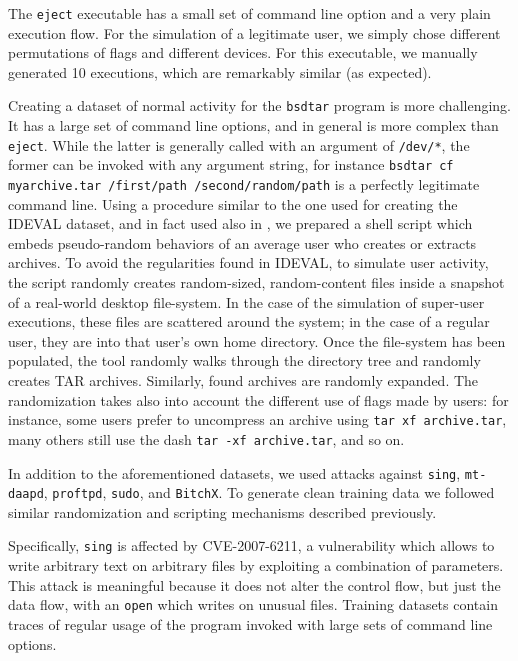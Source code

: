 The \texttt{eject} executable has a small set of command line option
and a very plain execution flow. For the simulation of a legitimate
user, we simply chose different permutations of flags and different
devices. For this executable, we manually generated 10 executions,
which are remarkably similar (as expected).

Creating a dataset of normal activity for the \texttt{bsdtar} program
is more challenging. It has a large set of command line options, and
in general is more complex than \texttt{eject}. While the latter is
generally called with an argument of \texttt{/dev/*}, the former can
be invoked with any argument string, for instance \texttt{bsdtar cf
  myarchive.tar /first/path /second/random/path} is a perfectly
legitimate command line. Using a procedure similar to the one used for
creating the \ac{IDEVAL} dataset, and in fact used also
in \citep{sekar:sp2001:automaton}, we prepared a shell script which
embeds pseudo-random behaviors of an average user who creates or
extracts archives. To avoid the regularities found in
\ac{IDEVAL}, to simulate user activity, the script
randomly creates random-sized, random-content files inside a snapshot
of a real-world desktop file-system. In the case of the simulation of
super-user executions, these files are scattered around the system; in
the case of a regular user, they are into that user's own home
directory. Once the file-system has been populated, the tool randomly
walks through the directory tree and randomly creates TAR
archives. Similarly, found archives are randomly expanded. The
randomization takes also into account the different use of flags made
by users: for instance, some users prefer to uncompress an archive
using \texttt{tar xf archive.tar}, many others still use the dash
\texttt{tar -xf archive.tar}, and so on.

In addition to the aforementioned datasets, we used attacks against
\texttt{sing}, \texttt{mt-daapd}, \texttt{proftpd}, \texttt{sudo}, and
\texttt{BitchX}. To generate clean training data we followed similar
randomization and scripting mechanisms described previously.

Specifically, \texttt{sing} is affected by CVE-2007-6211, a
vulnerability which allows to write arbitrary text on arbitrary files
by exploiting a combination of parameters. This attack is meaningful
because it does not alter the control flow, but just the data flow,
with an \texttt{open} which writes on unusual files. Training datasets
contain traces of regular usage of the program invoked with large sets
of command line options.

